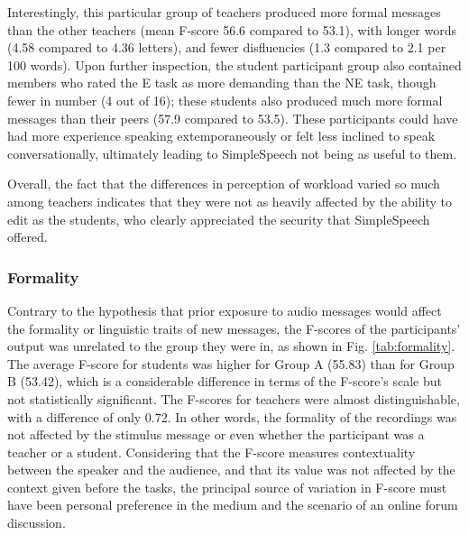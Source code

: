 Interestingly, this particular group of teachers produced more formal messages than the other teachers (mean F-score 56.6 compared to 53.1), with longer words (4.58 compared to 4.36 letters), and fewer disfluencies (1.3 compared to 2.1 per 100 words).
Upon further inspection, the student participant group also contained members who rated the E task as more demanding than the NE task, though fewer in number (4 out of 16); these students also produced much more formal messages than their peers (57.9 compared to 53.5). 
These participants could have had more experience speaking extemporaneously or felt less inclined to speak conversationally, ultimately leading to SimpleSpeech not being as useful to them.

Overall, the fact that the differences in perception of workload varied so much among teachers indicates that they were not as heavily affected by the ability to edit as the students, who clearly appreciated the security that SimpleSpeech offered.

\subsubsection{Formality}
Contrary to the hypothesis that prior exposure to audio messages would affect the formality or linguistic traits of new messages, the F-scores of the participants' output was unrelated to the group they were in, as shown in Fig. \ref{tab:formality}.
The average F-score for students was higher for Group A (55.83) than for Group B (53.42), which is a considerable difference in terms of the F-score's scale but not statistically significant. 
The F-scores for teachers were almost distinguishable, with a difference of only 0.72.
In other words, the formality of the recordings was not affected by the stimulus message or even whether the participant was a teacher or a student.
Considering that the F-score measures contextuality between the speaker and the audience, and that its value was not affected by the context given before the tasks, the principal source of variation in F-score must have been personal preference in the medium and the scenario of an online forum discussion.

